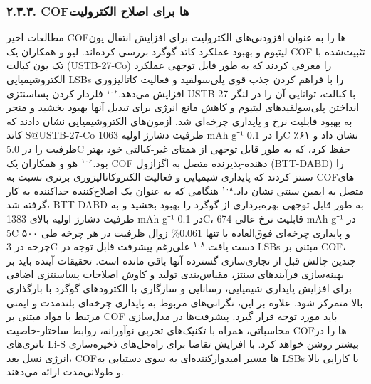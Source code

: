 \documentclass[12pt,a4paper,twocolumn]{article} %
\newcommand{\persian}[1]{\textfarsi{#1}}
\newcommand{\english}[1]{\textenglish{#1}}
\begin{document}
\subsubsection*{\persian{۲.۳.۳. \english{COF}ها برای اصلاح الکترولیت}}
\persian{
مطالعات اخیر \english{COF}ها را به عنوان افزودنی‌های الکترولیت برای افزایش انتقال یون لیتیوم و بهبود عملکرد کاتد گوگرد بررسی کرده‌اند. لیو و همکاران یک \english{COF} تثبیت‌شده با تک یون کبالت (\english{USTB-27-Co}) را معرفی کردند که به طور قابل توجهی عملکرد الکتروشیمیایی \english{LSBs} را با فراهم کردن جذب قوی پلی‌سولفید و فعالیت کاتالیزوری افزایش می‌دهد.$^{۱۰۶}$ فلزدار کردن پساسنتزی \english{USTB-27} با کبالت، توانایی آن را در لنگر انداختن پلی‌سولفیدهای لیتیوم و کاهش مانع انرژی برای تبدیل آنها بهبود بخشید و منجر به بهبود قابلیت نرخ و پایداری چرخه‌ای شد. آزمون‌های الکتروشیمیایی نشان دادند که کاتد \english{S@USTB-27-Co} ظرفیت دشارژ اولیه \english{1063 mAh g⁻¹} را در \english{0.1C} نشان داد و ۶۱٪ ظرفیت را در \english{5.0C} حفظ کرد، که به طور قابل توجهی از همتای غیر-کبالتی خود بهتر بود.$^{۱۰۶}$
}
\persian{
هو و همکاران یک \english{COF} دهنده-پذیرنده متصل به اگزازول (\english{BTT-DABD}) را سنتز کردند که پایداری شیمیایی و فعالیت الکتروکاتالیزوری برتری نسبت به \english{COF}های متصل به ایمین سنتی نشان داد.$^{۱۰۸}$ هنگامی که به عنوان یک اصلاح‌کننده جداکننده به کار گرفته شد، \english{BTT-DABD} به طور قابل توجهی بهره‌برداری از گوگرد را بهبود بخشید و به ظرفیت دشارژ اولیه بالای \english{1383 mAh g⁻¹} در \english{0.1C}، قابلیت نرخ عالی \english{674 mAh g⁻¹} در \english{5C} و پایداری چرخه‌ای فوق‌العاده با تنها \english{0.061\%} زوال ظرفیت در هر چرخه طی ۵۰۰ چرخه در \english{3C} دست یافت.$^{۱۰۸}$
}
\persian{
علی‌رغم پیشرفت قابل توجه در \english{LSBs} مبتنی بر \english{COF}، چندین چالش قبل از تجاری‌سازی گسترده آنها باقی مانده است. تحقیقات آینده باید بر بهینه‌سازی فرآیندهای سنتز، مقیاس‌بندی تولید و کاوش اصلاحات پساسنتزی اضافی برای افزایش پایداری شیمیایی، رسانایی و سازگاری با الکترودهای گوگرد با بارگذاری بالا متمرکز شود. علاوه بر این، نگرانی‌های مربوط به پایداری چرخه‌ای بلندمدت و ایمنی مرتبط با مواد مبتنی بر \english{COF} باید مورد توجه قرار گیرد. پیشرفت‌ها در مدل‌سازی محاسباتی، همراه با تکنیک‌های تجربی نوآورانه، روابط ساختار-خاصیت \english{COF}ها را در باتری‌های \english{Li-S} بیشتر روشن خواهد کرد. با افزایش تقاضا برای راه‌حل‌های ذخیره‌سازی انرژی نسل بعد، \english{COF}ها مسیر امیدوارکننده‌ای به سوی دستیابی به \english{LSBs} با کارایی بالا و طولانی‌مدت ارائه می‌دهند.
}
\end{document}
